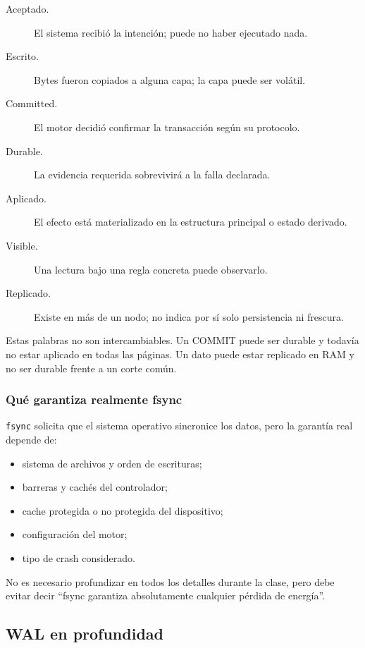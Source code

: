 \documentclass[variant=docente,cover=institutional,mode=screen]{ua-engineering-v6-article}
\begin{document}
\begin{description}
\item[Aceptado.] El sistema recibió la intención; puede no haber ejecutado nada.
\item[Escrito.] Bytes fueron copiados a alguna capa; la capa puede ser volátil.
\item[Committed.] El motor decidió confirmar la transacción según su protocolo.
\item[Durable.] La evidencia requerida sobrevivirá a la falla declarada.
\item[Aplicado.] El efecto está materializado en la estructura principal o estado derivado.
\item[Visible.] Una lectura bajo una regla concreta puede observarlo.
\item[Replicado.] Existe en más de un nodo; no indica por sí solo persistencia ni frescura.
\end{description}

Estas palabras no son intercambiables. Un COMMIT puede ser durable y todavía no estar aplicado en todas las páginas. Un dato puede estar replicado en RAM y no ser durable frente a un corte común.

\subsubsection*{Qué garantiza realmente fsync}

\texttt{fsync} solicita que el sistema operativo sincronice los datos, pero la garantía real depende de:

\begin{itemize}
\item sistema de archivos y orden de escrituras;
\item barreras y cachés del controlador;
\item cache protegida o no protegida del dispositivo;
\item configuración del motor;
\item tipo de crash considerado.
\end{itemize}

No es necesario profundizar en todos los detalles durante la clase, pero debe evitar decir ``fsync garantiza absolutamente cualquier pérdida de energía''.

\subsection{WAL en profundidad}
\end{document}
